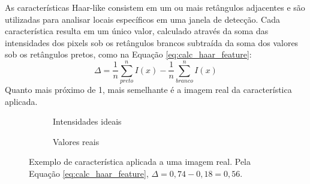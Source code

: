 As características Haar-like consistem em um ou mais retângulos adjacentes e são utilizadas para analisar locais específicos em uma janela de detecção. Cada característica resulta em um único valor, calculado através da soma das intensidades dos pixels sob os retângulos brancos subtraída da soma dos valores sob os retângulos pretos, como na Equação \ref{eq:calc_haar_feature}:
%
\begin{equation} \label{eq:calc_haar_feature}
\Delta = \frac{1}{n}  \sum_{preto}^{n} I(x) - \frac{1}{n}  \sum_{branco}^{n} I(x)
\end{equation}
%
Quanto mais próximo de 1, mais semelhante é a imagem real da característica aplicada.

\begin{figure}[htbp]
    \begin{subfigure}[c]{0.45\textwidth}
    \centering
    \caption{Intensidades ideais}
    \end{subfigure}
    \begin{subfigure}[c]{0.45\textwidth}
    \centering
    \caption{Valores reais}
    \end{subfigure}
    \caption{Exemplo de característica aplicada a uma imagem real. Pela Equação \ref{eq:calc_haar_feature}, $\Delta = 0,74 - 0,18 = 0,56$.}
\end{figure}

